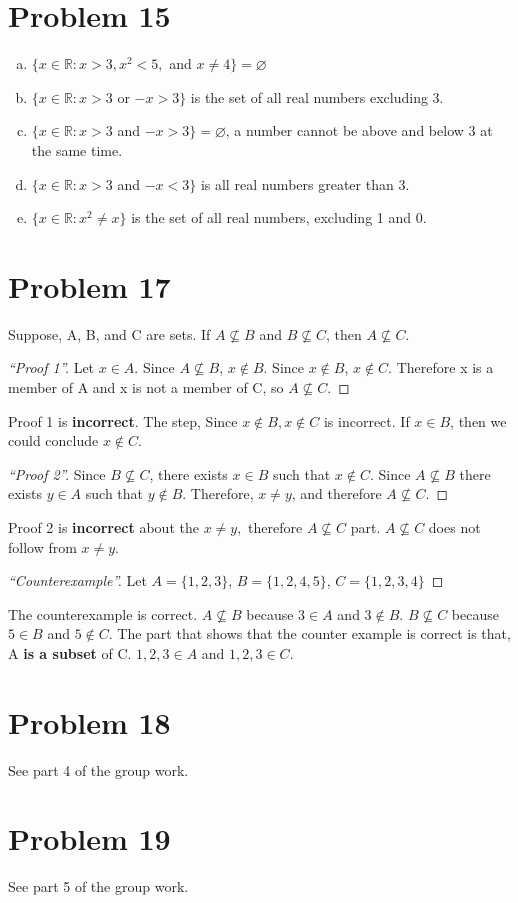 \documentclass{article}
\let\emptyset\varnothing
\newcounter{count}
\renewcommand{\qedsymbol}{$\blacksquare$}
\begin{document}
\section*{Problem 15}
\begin{multicols}{2}
  \begin{enumerate}[a)]
  \item $ \{ x \in \mathbb{R}: x > 3, x^2 < 5,$ and $x \not = 4 \} = \emptyset$
  \item $ \{ x \in \mathbb{R}: x > 3$ or $- x > 3 \}$ is the set of all real numbers excluding 3.
  \item $ \{ x \in \mathbb{R}: x > 3$ and $- x > 3 \} = \emptyset$, a number cannot be above and below 3 at the same time.
    \vfill
    \columnbreak
  \item $ \{ x \in \mathbb{R}: x > 3$ and $-x < 3 \}$ is all real numbers greater than 3.
  \item $ \{ x \in \mathbb{R}: x^2 \not = x \}$ is the set of all real numbers, excluding 1 and 0.
  \end{enumerate}
\end{multicols}

\section*{Problem 17}
Suppose, A, B, and C are sets. If $A \not \subseteq B$ and $B \not \subseteq C$, then $A \not \subseteq C$.\\
\renewcommand{\qedsymbol}{}
\begin{proof}[``Proof 1'']
 Let $x \in A$. Since $A \not \subseteq B$, $x \not \in B$. Since $x \not \in B$, $x \not \in C$. Therefore x is a member of A and x is not a member of C, so $A \not \subseteq C$.
\end{proof}
Proof 1 is \textbf{incorrect}. The step, Since $x \not \in B, x \not \in C$ is incorrect. If $x \in B$, then we could conclude $x \not \in C$.

\begin{proof}[``Proof 2''] 
Since $B \not \subseteq C$, there exists $x \in B$ such that $x \not \in C$. Since $A \not \subseteq B$ there exists $y \in A$ such that $y \not \in B$. Therefore, $x \not = y$, and therefore $A \not \subseteq C$.
\end{proof}
Proof 2 is \textbf{incorrect} about the $x \not = y,$ therefore $A \not \subseteq C$ part. $A \not \subseteq C$ does not follow from $x \not = y$.
\begin{proof}[``Counterexample''] Let $A = \{ 1,2,3 \}$, $B = \{ 1,2,4,5 \}$, $C = \{ 1,2,3,4 \}$
\end{proof}
The counterexample is correct. $A \not \subseteq B$ because $3 \in A$ and $3 \not \in B$. $B \not \subseteq C$ because $5 \in B$ and $5 \not \in C$. The part that shows that the counter example is correct is that, A \textbf{is a subset} of C. $1,2,3 \in A$ and $1,2,3 \in C$.
\section*{Problem 18}
See part 4 of the group work.
\section*{Problem 19}
See part 5 of the group work.
\end{document}
